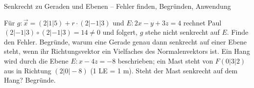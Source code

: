 \begin{aufgabe}{Senkrecht zu Geraden und Ebenen – Fehler finden, Begründen, Anwendung}
\begin{teile}
\teil Für $g\colon \vec x = (2 | 1 | 5) + r \cdot (2 | -1 | 3)$ und $E\colon 2x - y + 3z = 4$ rechnet Paul $(2 | -1 | 3) \circ (2 | -1 | 3) = 14 \ne 0$ und folgert, $g$ stehe nicht senkrecht auf $E$. Finde den Fehler.
\teil Begründe, warum eine Gerade genau dann senkrecht auf einer Ebene steht, wenn ihr Richtungsvektor ein Vielfaches des Normalenvektors ist.
\teil Ein Hang wird durch die Ebene $E\colon x - 4z = -8$ beschrieben; ein Mast steht von $F(0 | 3 | 2)$ aus in Richtung $(2 | 0 | -8)$ (1 LE = 1 m). Steht der Mast senkrecht auf dem Hang? Begründe.
\end{teile}
\end{aufgabe}
